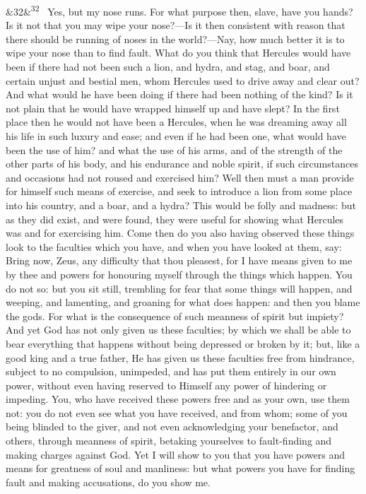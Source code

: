 \documentclass[12pt]{article}
\newcommand{\para}[1][]{\par\noindent\ifx&#1&\else\textsuperscript{\footnotesize #1}~\fi}
\begin{document}
\para[32] Yes, but my nose runs. For what purpose then, slave, have you hands? Is it not that you may wipe your nose?—Is it then consistent with reason that there should be running of noses in the world?—Nay, how much better it is to wipe your nose than to find fault. What do you think that Hercules would have been if there had not been such a lion, and hydra, and stag, and boar, and certain unjust and bestial men, whom Hercules used to drive away and clear out? And what would he have been doing if there had been nothing of the kind? Is it not plain that he would have wrapped himself up and have slept? In the first place then he would not have been a Hercules, when he was dreaming away all his life in such luxury and ease; and even if he had been one, what would have been the use of him? and what the use of his arms, and of the strength of the other parts of his body, and his endurance and noble spirit, if such circumstances and occasions had not roused and exercised him? Well then must a man provide for himself such means of exercise, and seek to introduce a lion from some place into his country, and a boar, and a hydra? This would be folly and madness: but as they did exist, and were found, they were useful for showing what Hercules was and for exercising him. Come then do you also having observed these things look to the faculties which you have, and when you have looked at them, say: Bring now, Zeus, any difficulty that thou pleasest, for I have means given to me by thee and powers for honouring myself through the things which happen. You do not so: but you sit still, trembling for fear that some things will happen, and weeping, and lamenting, and groaning for what does happen: and then you blame the gods. For what is the consequence of such meanness of spirit but impiety? And yet God has not only given us these faculties; by which we shall be able to bear everything that happens without being depressed or broken by it; but, like a good king and a true father, He has given us these faculties free from hindrance, subject to no compulsion, unimpeded, and has put them entirely in our own power, without even having reserved to Himself any power of hindering or impeding. You, who have received these powers free and as your own, use them not: you do not even see what you have received, and from whom; some of you being blinded to the giver, and not even acknowledging your benefactor, and others, through meanness of spirit, betaking yourselves to fault-finding and making charges against God. Yet I will show to you that you have powers and means for greatness of soul and manliness: but what powers you have for finding fault and making accusations, do you show me.
\end{document}
